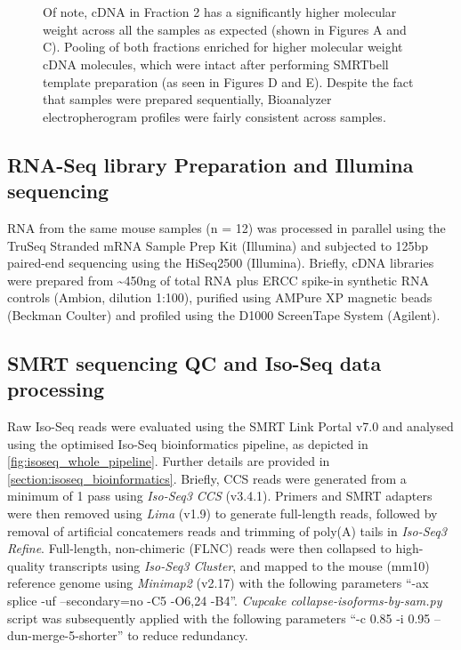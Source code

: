 \begin{figure}[!htp]
{	\\
	\\	 	
	Of note, cDNA in Fraction 2 has a significantly higher molecular weight across all the samples as expected (shown in Figures A and C). Pooling of both fractions enriched for higher molecular weight cDNA molecules, which were intact after performing SMRTbell template preparation (as seen in Figures D and E). Despite the fact that samples were prepared sequentially, Bioanalyzer electropherogram profiles were fairly consistent across samples. 
	}
	\label{fig:isoseq_whole_bioresults}
\end{figure}

\clearpage
\subsection{RNA-Seq library Preparation and Illumina sequencing}
RNA from the same mouse samples (n = 12) was processed in parallel using the TruSeq Stranded mRNA Sample Prep Kit (Illumina) and subjected to 125bp paired-end sequencing using the HiSeq2500 (Illumina)\cite{Castanho2020}. Briefly, cDNA libraries were prepared from \textasciitilde450ng of total RNA plus ERCC spike-in synthetic RNA controls (Ambion, dilution 1:100), purified using AMPure XP magnetic beads (Beckman Coulter) and profiled using the D1000 ScreenTape System (Agilent). 

\subsection{SMRT sequencing QC and Iso-Seq data processing}\label{ch4_methods: isoseq_data}
Raw Iso-Seq reads were evaluated using the SMRT Link Portal v7.0 and analysed using the optimised Iso-Seq bioinformatics pipeline, as depicted in \cref{fig:isoseq_whole_pipeline}. Further details are provided in \cref{section:isoseq_bioinformatics}. Briefly, CCS reads were generated from a minimum of 1 pass using \textit{Iso-Seq3 CCS} (v3.4.1). Primers and SMRT adapters were then removed using \textit{Lima} (v1.9) to generate full-length reads, followed by removal of artificial concatemers reads and trimming of poly(A) tails in \textit{Iso-Seq3 Refine}. Full-length, non-chimeric (FLNC) reads were then collapsed to high-quality transcripts using \textit{Iso-Seq3 Cluster}, and mapped to the mouse (mm10) reference genome using \textit{Minimap2} (v2.17) with the following parameters “-ax splice -uf --secondary=no -C5 -O6,24 -B4”. \textit{ Cupcake collapse-isoforms-by-sam.py} script was subsequently applied with the following parameters  “-c 0.85 -i 0.95 --dun-merge-5-shorter” to reduce redundancy. 

